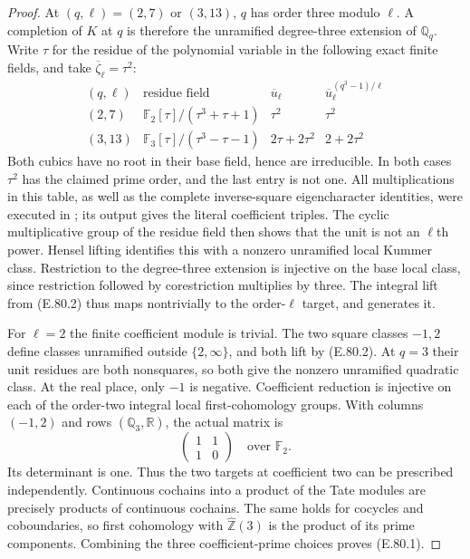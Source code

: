 \begin{proof}
At $(q,\ell)=(2,7)$ or $(3,13)$, $q$ has order three modulo
$\ell$. A completion of $K$ at $q$ is therefore the unramified
degree-three extension of $\mathbb Q_q$. Write $\tau$ for the
residue of the polynomial variable in the following exact
finite fields, and take $\overline\zeta_\ell=\tau^2$:
\[
\begin{array}{c|c|c|c}
 (q,\ell)&\text{residue field}&\overline u_\ell&
       \overline u_\ell^{(q^3-1)/\ell}\\ \hline
 (2,7)&\mathbb F_2[\tau]/(\tau^3+\tau+1)&\tau^2&\tau^2\\
 (3,13)&\mathbb F_3[\tau]/(\tau^3-\tau-1)&
                 2\tau+2\tau^2&2+2\tau^2
\end{array}
\tag{E.80.4}
\]
Both cubics have no root in their base field, hence are
irreducible. In both cases $\tau^2$ has the claimed prime order,
and the last entry is not one. All multiplications in this table,
as well as the complete inverse-square eigencharacter identities,
were executed in ; its
output gives the literal coefficient triples. The cyclic
multiplicative group of the residue field then shows that the
unit is not an $\ell$th power. Hensel lifting identifies this
with a nonzero unramified local Kummer class. Restriction to the
degree-three extension is injective on the base local class,
since restriction followed by corestriction multiplies by three.
The integral lift from (E.80.2) thus maps nontrivially to the
order-$\ell$ target, and generates it.

For $\ell=2$ the finite coefficient module is trivial. The
two square classes $-1,2$ define classes unramified outside
$\{2,\infty\}$, and both lift by (E.80.2). At $q=3$ their
unit residues are both nonsquares, so both give the nonzero
unramified quadratic class. At the real place, only $-1$ is
negative. Coefficient reduction is injective on each of the
order-two integral local first-cohomology groups. With columns
$(-1,2)$ and rows $(\mathbb Q_3,\mathbb R)$, the actual matrix is
\[
                     \begin{pmatrix}1&1\\1&0\end{pmatrix}
                   \quad\text{over }\mathbb F_2.
 \tag{E.80.5}
\]
Its determinant is one. Thus the two targets at coefficient two
can be prescribed independently. Continuous cochains into a
product of the Tate modules are precisely products of continuous
cochains. The same holds for cocycles and coboundaries, so first
cohomology with $\widehat{\mathbb Z}(3)$ is the product of its
prime components. Combining the three coefficient-prime choices
proves (E.80.1).


\end{proof}
